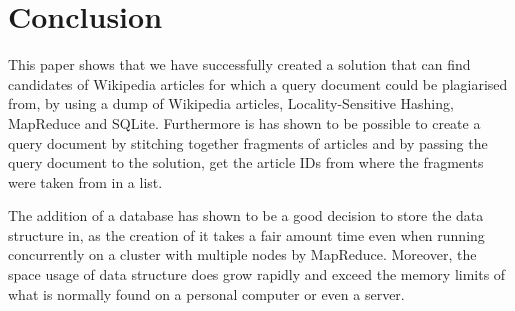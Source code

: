 \section{Conclusion}
This paper shows that we have successfully created a solution that can find candidates of Wikipedia articles for which a query document could be plagiarised from, by using a dump of Wikipedia articles, Locality-Sensitive Hashing, MapReduce and SQLite. Furthermore is has shown to be possible to create a query document by stitching together fragments of articles and by passing the query document to the solution, get the article IDs from where the fragments were taken from in a list.

The addition of a database has shown to be a good decision to store the data structure in, as the creation of it takes a fair amount time even when running concurrently on a cluster with multiple nodes by MapReduce. Moreover, the space usage of data structure does grow rapidly and exceed the memory limits of what is normally found on a personal computer or even a server.
